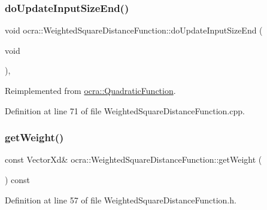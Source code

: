 \subsubsection{\texorpdfstring{do\+Update\+Input\+Size\+End()}{doUpdateInputSizeEnd()}}
{\footnotesize\ttfamily void ocra\+::\+Weighted\+Square\+Distance\+Function\+::do\+Update\+Input\+Size\+End (\begin{DoxyParamCaption}\item[{void}]{ }\end{DoxyParamCaption})\hspace{0.3cm}{\ttfamily [protected]}, {\ttfamily [virtual]}}



Reimplemented from \hyperlink{classocra_1_1QuadraticFunction_ab3d5478fd8ded343453e0489c595e580}{ocra\+::\+Quadratic\+Function}.



Definition at line 71 of file Weighted\+Square\+Distance\+Function.\+cpp.

\hypertarget{classocra_1_1WeightedSquareDistanceFunction_a830f93e5be8ede8c5cdc18396e89ead3}{}\label{classocra_1_1WeightedSquareDistanceFunction_a830f93e5be8ede8c5cdc18396e89ead3} 
\subsubsection{\texorpdfstring{get\+Weight()}{getWeight()}}
{\footnotesize\ttfamily const Vector\+Xd\& ocra\+::\+Weighted\+Square\+Distance\+Function\+::get\+Weight (\begin{DoxyParamCaption}{ }\end{DoxyParamCaption}) const\hspace{0.3cm}{\ttfamily [inline]}}



Definition at line 57 of file Weighted\+Square\+Distance\+Function.\+h.

\hypertarget{classocra_1_1WeightedSquareDistanceFunction_adb2aad2190e474c2975a5544f0122585}{}\label{classocra_1_1WeightedSquareDistanceFunction_adb2aad2190e474c2975a5544f0122585} 
